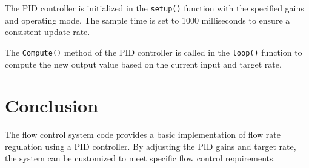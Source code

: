 \documentclass{article}
\begin{document}
The PID controller is initialized in the \texttt{setup()} function with the specified gains and operating mode. The sample time is set to 1000 milliseconds to ensure a consistent update rate.

The \texttt{Compute()} method of the PID controller is called in the \texttt{loop()} function to compute the new output value based on the current input and target rate.

\section*{Conclusion}
The flow control system code provides a basic implementation of flow rate regulation using a PID controller. By adjusting the PID gains and target rate, the system can be customized to meet specific flow control requirements.
\end{document}
